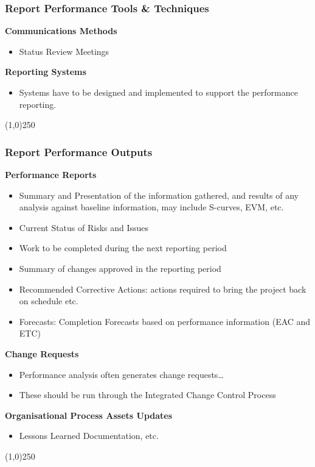 \begin{frame}
\frametitle{Report Performance \hfill\hfill Tools \& Techniques}
\textbf{Communications Methods}
\begin{itemize}
	\item Status Review Meetings
\end{itemize}
\textbf{Reporting Systems}
\begin{itemize}
	\item Systems have to be designed and implemented to support the performance reporting.
\end{itemize}
\end{frame}\begin{center}\line(1,0){250}\end{center}


\begin{frame}
\frametitle{Report Performance \hfill\hfill Outputs}
\textbf{Performance Reports}
\begin{itemize}
	\item Summary and Presentation of the information gathered, and results of any analysis against baseline information, may include S-curves, EVM, etc.
	\item Current Status of Risks and Issues
	\item Work to be completed during the next reporting period
	\item Summary of changes approved in the reporting period
	\item Recommended Corrective Actions: actions required to bring the project back on schedule etc.
	\item Forecasts: Completion Forecasts based on performance information (EAC and ETC)
\end{itemize}
\textbf{Change Requests}
\begin{itemize}
	\item Performance analysis often generates change requests\dots
	\item These should be run through the Integrated Change Control Process
\end{itemize}
\textbf{Organisational Process Assets Updates}
\begin{itemize}
	\item Lessons Learned Documentation, etc.
\end{itemize}
\end{frame}\begin{center}\line(1,0){250}\end{center}



